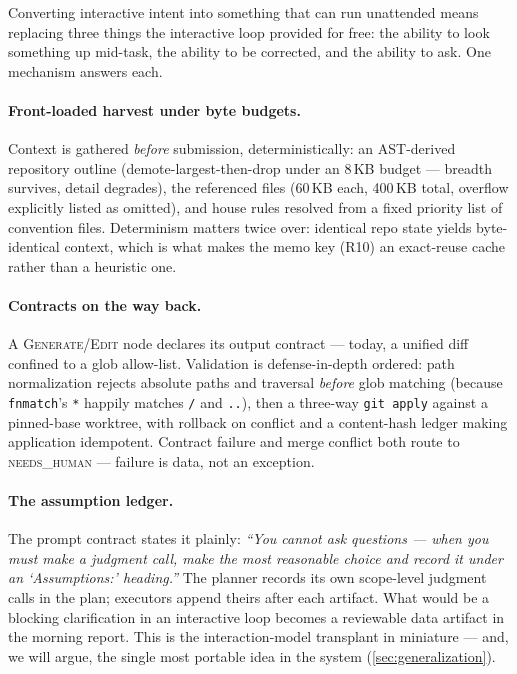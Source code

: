 \documentclass[11pt]{article}
\begin{document}
Converting interactive intent into something that can run unattended means replacing three things the interactive loop provided for free: the ability to look something up mid-task, the ability to be corrected, and the ability to ask. One mechanism answers each.

\paragraph{Front-loaded harvest under byte budgets.} Context is gathered \emph{before} submission, deterministically: an AST-derived repository outline (demote-largest-then-drop under an 8\,KB budget --- breadth survives, detail degrades), the referenced files (60\,KB each, 400\,KB total, overflow explicitly listed as omitted), and house rules resolved from a fixed priority list of convention files. Determinism matters twice over: identical repo state yields byte-identical context, which is what makes the memo key (R10) an exact-reuse cache rather than a heuristic one.

\paragraph{Contracts on the way back.} A \textsc{Generate}/\textsc{Edit} node declares its output contract --- today, a unified diff confined to a glob allow-list. Validation is defense-in-depth ordered: path normalization rejects absolute paths and traversal \emph{before} glob matching (because \texttt{fnmatch}'s \texttt{*} happily matches \texttt{/} and \texttt{..}), then a three-way \texttt{git apply} against a pinned-base worktree, with rollback on conflict and a content-hash ledger making application idempotent. Contract failure and merge conflict both route to \textsc{needs\_human} --- failure is data, not an exception.

\paragraph{The assumption ledger.} The prompt contract states it plainly: \emph{``You cannot ask questions --- when you must make a judgment call, make the most reasonable choice and record it under an `Assumptions:' heading.''} The planner records its own scope-level judgment calls in the plan; executors append theirs after each artifact. What would be a blocking clarification in an interactive loop becomes a reviewable data artifact in the morning report. This is the interaction-model transplant in miniature --- and, we will argue, the single most portable idea in the system (\cref{sec:generalization}).
\end{document}
